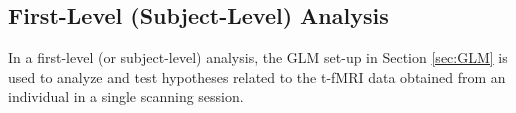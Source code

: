 %

\subsection{First-Level (Subject-Level) Analysis}
\label{sec:first_level}

In a first-level (or subject-level) analysis, the GLM set-up in Section \ref{sec:GLM} is used to analyze and test hypotheses related to the t-fMRI data obtained from an individual in a single scanning session. 


